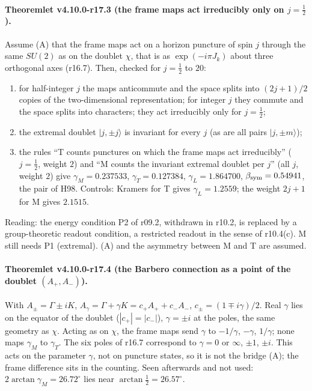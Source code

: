 \paragraph{Theoremlet v4.10.0-r17.3 (the frame maps act irreducibly only on \(j=\tfrac12\)).}
Assume (A) that the frame maps act on a horizon puncture of spin \(j\) through the same \(SU(2)\) as on the doublet \(\chi\), that is as
\(\exp(-i\pi J_k)\) about three orthogonal axes (r16.7).  Then, checked for \(j=\tfrac12\) to \(20\):
\begin{enumerate}[leftmargin=2em]
\item[(a)] for half-integer \(j\) the maps anticommute and the space splits into \((2j+1)/2\) copies of the two-dimensional
representation; for integer \(j\) they commute and the space splits into characters; they act irreducibly only for \(j=\tfrac12\);
\item[(b)] the extremal doublet \(|j,\pm j\rangle\) is invariant for every \(j\) (as are all pairs \(|j,\pm m\rangle\));
\item[(c)] the rules ``T counts punctures on which the frame maps act irreducibly'' (\(j=\tfrac12\), weight \(2\)) and ``M counts the
invariant extremal doublet per \(j\)'' (all \(j\), weight \(2\)) give \(\gamma_M=0.237533\), \(\gamma_T=0.127384\), \(\gamma_L=1.864700\),
\(\beta_{\rm sym}=0.54941\), the pair of H98.  Controls: Kramers for T gives \(\gamma_L=1.2559\); the weight \(2j+1\) for M gives \(2.1515\).
\end{enumerate}
Reading: the energy condition P2 of r09.2, withdrawn in r10.2, is replaced by a group-theoretic readout condition, a restricted
readout in the sense of r10.4(c).  M still needs P1 (extremal).  (A) and the asymmetry between M and T are assumed.

\paragraph{Theoremlet v4.10.0-r17.4 (the Barbero connection as a point of the doublet \((A_+,A_-)\)).}
With \(A_\pm=\Gamma\pm iK\), \(A_\gamma=\Gamma+\gamma K=c_+A_++c_-A_-\), \(c_\pm=(1\mp i\gamma)/2\).  Real \(\gamma\) lies on the equator of the doublet
(\(|c_+|=|c_-|\)), \(\gamma=\pm i\) at the poles, the same geometry as \(\chi\).  Acting as on \(\chi\), the frame maps send \(\gamma\) to \(-1/\gamma\), \(-\gamma\),
\(1/\gamma\); none maps \(\gamma_M\) to \(\gamma_T\).  The six poles of r16.7 correspond to \(\gamma=0\) or \(\infty\), \(\pm1\), \(\pm i\).  This acts on the
parameter \(\gamma\), not on puncture states, so it is not the bridge (A); the frame difference sits in the counting.  Seen afterwards
and not used: \(2\arctan\gamma_M=26.72^\circ\) lies near \(\arctan\tfrac12=26.57^\circ\).

